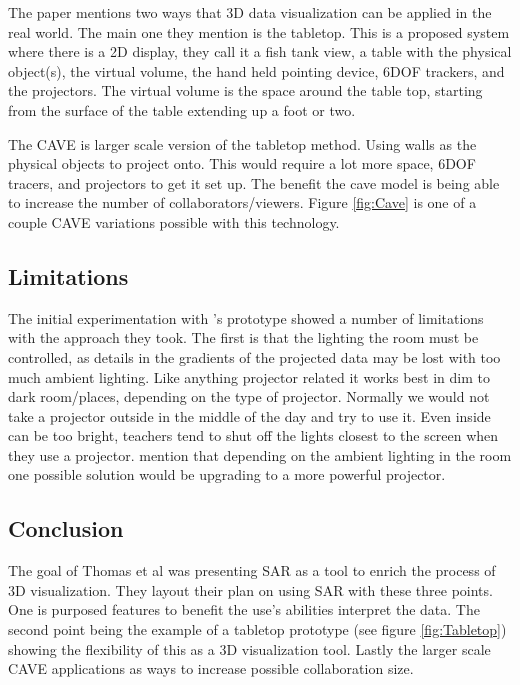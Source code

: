 \documentclass{sig-alternate}
\begin{document}
The paper mentions two ways that 3D data visualization can be applied in the real world. The main one they mention is the tabletop. This is a proposed system where there is a 2D display, they call it a fish tank view, a table with the physical object(s), the virtual volume, the hand held pointing device, 6DOF trackers, and the projectors. The virtual volume is the space around the table top, starting from the surface of the table extending up a foot or two. 

The CAVE is larger scale version of the tabletop method. Using walls as the physical objects to project onto. This would require a lot more space, 6DOF tracers, and projectors to get it set up. The benefit the cave model is being able to increase the number of collaborators/viewers. Figure \ref{fig:Cave} is one of a couple CAVE variations possible with this technology.

\subsection{Limitations}
\label{sec:Limitations}

The initial experimentation with \cite{3D}'s prototype showed a number of limitations with the approach they took. The first is that the lighting the room must be controlled, as details in the gradients of the projected data may be lost with too much ambient lighting. Like anything projector related it works best in dim to dark room/places, depending on the type of projector. Normally we would not take a projector outside in the middle of the day and try to use it. Even inside can be too bright, teachers tend to shut off the lights closest to the screen when they use a projector. \cite{3D} mention that depending on the ambient lighting in the room one possible solution would be upgrading to a more powerful projector.  

\subsection{Conclusion}
\label{sec:Conclusion}

The goal of Thomas et al \cite{3D} was presenting SAR as a tool to enrich the process of 3D visualization. They layout their plan on using SAR with these three points. One is purposed features to benefit the use's abilities interpret the data. The second point being the example of a tabletop prototype (see figure \ref{fig:Tabletop}) showing the flexibility of this as a 3D visualization tool. Lastly the larger scale CAVE applications as ways to increase possible collaboration size.      
\end{document}
